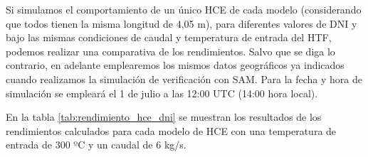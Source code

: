 Si simulamos el comportamiento de un único HCE de cada modelo (considerando que todos tienen la misma longitud de 4,05 m),  para  diferentes valores de DNI y bajo las mismas condiciones de caudal y temperatura de entrada del HTF, podemos realizar una comparativa de los rendimientos. Salvo que se diga lo contrario, en adelante emplearemos los mismos datos geográficos ya indicados cuando realizamos la simulación de verificación con SAM. Para la fecha y hora de simulación se empleará el 1 de julio a las 12:00 UTC (14:00 hora local).

En la tabla \ref{tab:rendimiento_hce_dni} se muestran los resultados de los rendimientos calculados para cada modelo de HCE con una temperatura de entrada de 300 ºC y un caudal de 6 kg/s.
\begin{table}[H]
\centering
\caption{Rendimiento en función de la radiación normal incidente para  distintos modelos de HCE}
\label{tab:rendimiento_hce_dni}
\end{table}


